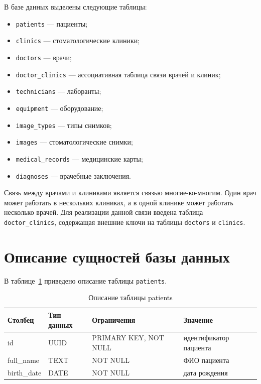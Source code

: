 В базе данных выделены следующие таблицы:
\begin{itemize}
	\item \texttt{patients} --- пациенты;
	\item \texttt{clinics} --- стоматологические клиники;
	\item \texttt{doctors} --- врачи;
	\item \texttt{doctor\_clinics} --- ассоциативная таблица связи врачей и клиник;
	\item \texttt{technicians} --- лаборанты;
	\item \texttt{equipment} --- оборудование;
	\item \texttt{image\_types} --- типы снимков;
	\item \texttt{images} --- стоматологические снимки;
	\item \texttt{medical\_records} --- медицинские карты;
	\item \texttt{diagnoses} --- врачебные заключения.
\end{itemize}

Связь между врачами и клиниками является связью многие-ко-многим. Один врач может работать в нескольких клиниках, а в одной клинике может работать несколько врачей. Для реализации данной связи введена таблица \texttt{doctor\_clinics}, содержащая внешние ключи на таблицы \texttt{doctors} и \texttt{clinics}.

\section{Описание сущностей базы данных}

В таблице~\ref{tab:patients-design} приведено описание таблицы \texttt{patients}.

\begin{table}[H]
	\caption{Описание таблицы patients}
	\label{tab:patients-design}
	\centering
	\begin{tabular}{|p{}|p{}|p{}|p{}|}
		\hline
		Столбец & Тип данных & Ограничения & Значение \\
		\hline
		id & UUID & PRIMARY KEY, NOT NULL & идентификатор пациента \\
		\hline
		full\_name & TEXT & NOT NULL & ФИО пациента \\
		\hline
		birth\_date & DATE & NOT NULL & дата рождения \\
		\hline
	\end{tabular}
\end{table}

